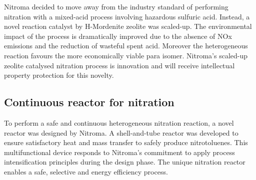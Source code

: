 Nitroma decided to move away from the industry standard of performing nitration with a mixed-acid process involving hazardous sulfuric acid. Instead, a novel reaction catalyst by H-Mordenite zeolite was scaled-up. The environmental impact of the process is dramatically improved due to the absence of NOx emissions and the reduction of wasteful spent acid. Moreover the heterogeneous reaction favours the more economically viable para isomer. Nitroma's scaled-up zeolite catalysed nitration process is innovation and will receive intellectual property protection for this novelty. 

\subsection{Continuous reactor for nitration}

To perform a safe and continuous heterogeneous nitration reaction, a novel reactor was designed by Nitroma. A shell-and-tube reactor was developed to ensure satisfactory heat and mass transfer to safely produce nitrotoluenes. This multifunctional device responds to Nitroma's commitment to apply process intensification principles during the design phase. The unique nitration reactor enables a safe, selective and energy efficiency process.
